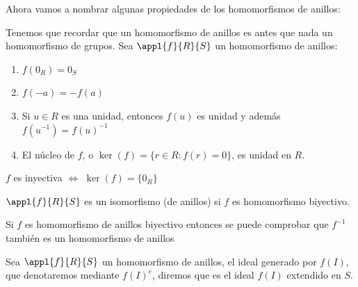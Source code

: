 Ahora vamos a nombrar algunas propiedades de los homomorfismos de anillos:

Tenemos que recordar que un homomorfismo de anillos es antes que nada un homomorfismo de grupos. Sea $\appl{f}{R}{S}$ un homomorfismo de anillos:
\begin{enumerate}
\item $f(0_R)=0_S$
\item $f(-a)=-f(a)$
\item Si $u \in R$ es una unidad, entonces $f(u)$ es unidad y además $f(u^{-1})=f(u)^{-1}$
\item El núcleo de $f$, o $\ker(f)=\{ r \in R: f(r)=0 \}$, es unidad en $R$.
\end{enumerate}

\begin{prop}\label{prop:hda_inyectiva}
	$f$ es inyectiva $\Leftrightarrow$ $\ker (f)=\{0_R \}$
\end{prop}

\begin{defn}
	$\appl{f}{R}{S}$ es un isomorfismo (de anillos) si $f$ es homomorfismo biyectivo.
\end{defn}

\begin{prop}
	Si $f$ es homomorfismo de anillos biyectivo entonces se puede comprobar que $f^{-1}$ también es un homomorfismo de anillos
\end{prop}

\begin{defn}
	Sea $\appl{f}{R}{S}$ un homomorfismo de anillos, el ideal generado por $f(I)$, que denotaremos mediante $f(I)^e$, diremos que es el ideal $f(I)$ extendido en $S$.
\end{defn}


